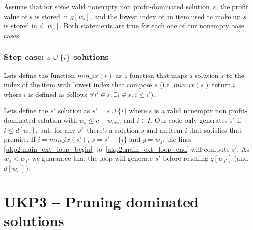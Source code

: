 \documentclass[12pt]{article}
\begin{document}
Assume that for some valid nonempty non profit-dominated solution~\(s\), the profit value of \(s\) is stored in \(g[w_s]\), and the lowest index of an item used to make up \(s\) is stored in \(d[w_s]\). Both statements are true for each one of our nonempty base cases.

\subsubsection{Step case: \(s \cup \{i\}\) solutions}

Lets define the function \(min\_ix(s)\) as a function that maps a solution \(s\) to the index of the item with lowest index that compose \(s\) (i.e. \(min\_ix(s)\) return \(i\) where \(i\) is defined as follows \(\forall i' \in s.~\exists i \in s.~i \leq i'\)).

Lets define the \(s'\) solution as \(s' = s \cup \{i\}\) where \(s\) is a valid nonempty non profit-dominated solution with \(w_s \leq c-w_{min}\) and \(i \in I\). Our code only generates \(s'\) if \(i \leq d[w_s]\), but, for any \(s'\), there's a solution \(s\) and an item \(i\) that satisfies that premise. If \(i = min\_ix(s')\), \(s = s' - \{i\}\) and \(y = w_s\), the lines \ref{ukp2:main_ext_loop_begin}~to~\ref{ukp2:main_ext_loop_end} will compute \(s'\). As \(w_s < w_{s'}\) we guarantee that the loop will generate \(s'\) before reaching \(g[w_{s'}]\) (and \(d[w_{s'}]\)).

\section{UKP3 -- Pruning dominated solutions}
\end{document}
